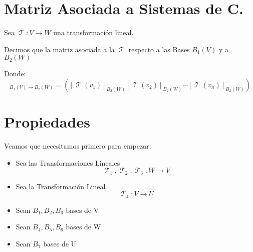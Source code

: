\documentclass[12pt]{report}                                %
\DeclareMathOperator \LinealTransformation {\mathcal{T}}
\begin{document}
    \clearpage
    \section{Matriz Asociada a Sistemas de C.}
        Sea $\LinealTransformation : V \to W $ una transformación lineal.
        
        Decimos que la matriz asociada a la $\LinealTransformation$ respecto a las Bases 
        $B_{1}(V)$ y a $B_{2}(W)$

        Donde:
        \begin{equation*}
            [\LinealTransformation]_{B_{1}(V) \to B_{2}(W)} = 
            \left(
                [\LinealTransformation(v_1)]_{B_{2}(W)}
                [\LinealTransformation(v_2)]_{B_{2}(W)}
                \cdots
                [\LinealTransformation(v_n)]_{B_{2}(W)}
            \right)
        \end{equation*}


        \clearpage
        \section{Propiedades}

            Veamos que necesitamos primero para empezar:
            
            \begin{itemize}
                \item Sea las Transformaciones Lineales 
                    $$\LinealTransformation_1, \LinealTransformation_2, \LinealTransformation_3 : W \to V$$
                
                \item Sea la Transformación Lineal $$\LinealTransformation_4: V \to U$$
                
                \item Sean $B_1, B_2, B_3$ bases de V
                
                \item Sean $B_4, B_5, B_6$ bases de W
                
                \item Sean $B_7$ bases de U
            \end{itemize}
\end{document}

